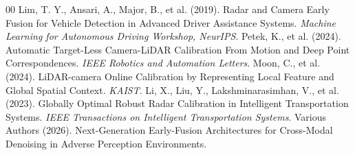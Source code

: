 \documentclass[conference]{IEEEtran}
\begin{document}
\begin{thebibliography}{00}
 Lim, T. Y., Ansari, A., Major, B., et al. (2019). Radar and Camera Early Fusion for Vehicle Detection in Advanced Driver Assistance Systems. \textit{Machine Learning for Autonomous Driving Workshop, NeurIPS}.
 Petek, K., et al. (2024). Automatic Target-Less Camera-LiDAR Calibration From Motion and Deep Point Correspondences. \textit{IEEE Robotics and Automation Letters}.
 Moon, C., et al. (2024). LiDAR-camera Online Calibration by Representing Local Feature and Global Spatial Context. \textit{KAIST}.
 Li, X., Liu, Y., Lakshminarasimhan, V., et al. (2023). Globally Optimal Robust Radar Calibration in Intelligent Transportation Systems. \textit{IEEE Transactions on Intelligent Transportation Systems}.
 Various Authors (2026). Next-Generation Early-Fusion Architectures for Cross-Modal Denoising in Adverse Perception Environments.
\end{thebibliography}
\end{document}
